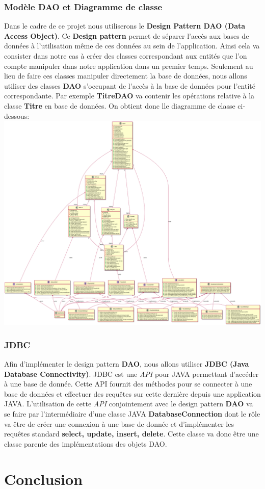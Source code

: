 \documentclass[a4paper,10pt, french]{report}
\begin{document}
  \subsection{Modèle DAO et Diagramme de classe}
    Dans le cadre de ce projet nous utiliserons le \textbf{Design Pattern DAO (Data Access Object)}. Ce \textbf{Design pattern} permet de séparer l'accès aux bases de données à l'utilisation même de ces données au sein de l'application. Ainsi cela va consister dans notre cas à créer des classes correspondant aux entités que l'on compte manipuler dans notre application dans un premier temps. Seulement au lieu de faire ces classes manipuler directement la base de données, nous allons utiliser des classes \textbf{DAO} s'occupant de l'accès à la base de données pour l'entité correspondante. Par exemple \textbf{TitreDAO} va contenir les opérations relative à la classe \textbf{Titre} en base de données. On obtient donc lle diagramme de classe ci-dessous:
    \includegraphics[scale=0.2]{class_diagram.png}
  \subsection{JDBC}
    Afin d'implémenter le design pattern \textbf{DAO}, nous allons utiliser \textbf{JDBC (Java Database Connectivity)}. JDBC est une \emph{API} pour JAVA permettant d'accéder à une base de donnée. Cette API fournit des méthodes pour se connecter à une base de données et effectuer des requêtes sur cette dernière depuis une application JAVA. L'utilisation de cette \emph{API} conjointement avec le design pattern \textbf{DAO} va se faire par l'intermédiaire d'une classe JAVA \textbf{DatabaseConnection} dont le rôle va être de créer une connexion à une base de donnée et d'implémenter les requêtes standard \textbf{select, update, insert, delete}. Cette classe va donc être une classe parente des implémentations des objets DAO.
\chapter*{Conclusion}
\end{document}
